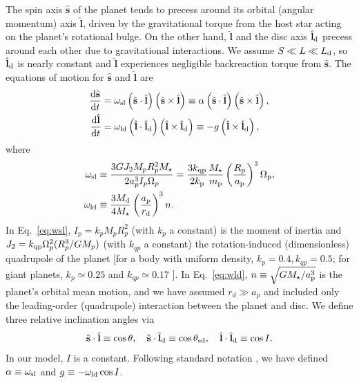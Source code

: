 \documentclass[
        fleqn,
        usenatbib,
    ]{mnras}
\newcommand*{\rd}[2]{\frac{\mathrm{d}#1}{\mathrm{d}#2}}
\newcommand*{\bm}[1]{\boldsymbol{\mathbf{#1}}}
\newcommand*{\uv}[1]{\hat{\bm{#1}}}
\newcommand*{\p}[1]{\left(#1\right)}
\begin{document}
The spin axis $\uv{s}$ of the planet tends to precess around its orbital
(angular momentum) axis $\uv{l}$, driven by the gravitational torque from the
host star acting on the planet's rotational bulge. On the other hand, $\uv{l}$
and the disc axis $\uv{l}_{\rm d}$ precess around each other due to
gravitational interactions. We assume $S \ll L \ll L_{\rm d}$, so $\uv{l}_{\rm
d}$ is nearly constant and $\uv{l}$ experiences negligible backreaction torque
from $\uv{s}$. The
equations of motion for $\uv{s}$ and $\uv{l}$ are
\begin{align}
    \rd{\uv{s}}{t} &= \omega_{\rm sl} \p{\uv{s} \cdot \uv{l}}
            \p{\uv{s} \times \uv{l}}
        \equiv \alpha \p{\uv{s} \cdot \uv{l}}
            \p{\uv{s} \times \uv{l}},\label{eq:dsdt}\\
    \rd{\uv{l}}{t} &= \omega_{\rm ld}\p{\uv{l} \cdot \uv{l}_{\rm d}}
            \p{\uv{l} \times \uv{l}_{\rm d}}
        \equiv -g\p{\uv{l} \times \uv{l}_{\rm d}},
            \label{eq:dldt}
\end{align}
where
\begin{align}
    \omega_{\rm sl} &\equiv \frac{3GJ_2 M_pR_p^2 M_\star}{2a_p^3 I_p\Omega_p}
        = \frac{3k_{\rm qp}}{2k_{\rm p}} \frac{M_\star}{m_{\rm p}}
            \p{\frac{R_{\rm p}}{a_{\rm p}}}^3 \Omega_{\rm p},\label{eq:wsl}\\
    \omega_{\rm ld} &\equiv \frac{3M_{\rm d}}{4M_\star}\p{\frac{a_{\rm
            p}}{r_{\rm d}}}^3 n .\label{eq:wld}
\end{align}
In Eq.~\eqref{eq:wsl}, $I_p = k_p M_pR_p^2$ (with $k_p$ a constant) is the
moment of inertia and $J_2=k_{\rm qp}\Omega_p^2 (R_p^3/GM_p)$ (with $k_{qp}$ a
constant) the rotation-induced (dimensionless) quadrupole of the planet [for a
body with uniform density, $k_p=0.4, k_{qp}=0.5$; for giant planets, $k_p\simeq
0.25$ and $k_{qp}\simeq 0.17$ \citep[e.g.][]{lainey2016quantification}]. In
Eq.~\eqref{eq:wld}, $n \equiv \sqrt{GM_\star/a_{\rm p}^3}$ is the planet's
orbital mean motion, and we have assumed $r_d\gg a_p$ and included only the
leading-order (quadrupole) interaction between the planet and disc. We define
three relative inclination angles via
\begin{equation}
  \uv{s} \cdot \uv{l}\equiv \cos\theta,\quad
  \uv{s} \cdot \uv{l}_{\rm d}\equiv \cos\theta_{\rm sd},\quad
  \uv{l} \cdot \uv{l}_{\rm d}\equiv \cos I.
\end{equation}
In our model, $I$ is a constant.
Following standard notation \citep[e.g.][]{colombo1966,peale1969,ward2004I}, we
have defined $\alpha \equiv \omega_{\rm sl}$ and $g \equiv -\omega_{\rm ld}\cos I$.
\end{document}
